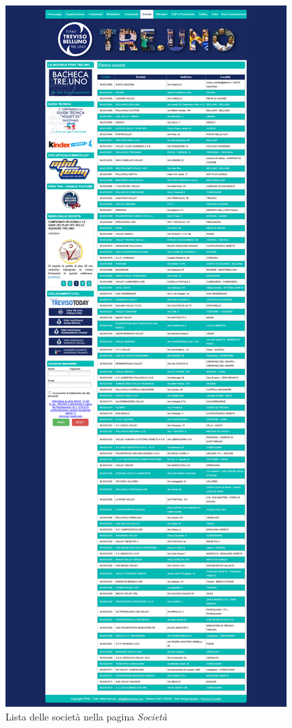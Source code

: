 	\begin{figure}[H]
	\centering
	\includegraphics[scale=0.15]{Images/societa.png}
	\caption{Lista delle società nella pagina \textit{Società}}
	\end{figure}
	
